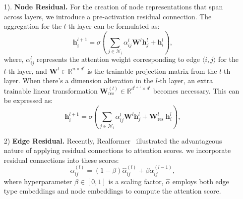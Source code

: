 \begin{itemize}
    \item[1).]{{\bf Node Residual.} For the creation of node representations that span across layers, we introduce a pre-activation residual connection. The aggregation for the $l$-th layer can be formulated as:
    \begin{equation}
        \mathbf{h}_i^{l+1}=\sigma\left(\sum_{j \in \mathcal{N}_i} \alpha_{ij}^{l} \mathbf{W}^{l} \mathbf{h}_j^{l}+\mathbf{h}_i^{l}\right),
       \label{eq:node1}
    \end{equation}
    where, $\alpha_{ij}^l$ represents the attention weight corresponding to edge $\langle i, j\rangle $ for the $l$-th layer, and $\mathbf{W}^l \in \mathbb{R}^{n \times {d^{l}}}$ is the trainable projection matrix from the $l$-th layer. When there's a dimension alteration in the $l$-th layer, an extra trainable linear transformation $\mathbf{W}_{\text{res}}^{(l)} \in \mathbb{R}^{d^{l+1} \times d^{l}}$ becomes necessary. This can be expressed as:
    \begin{equation}
        \mathbf{h}_i^{l+1}=\sigma(\sum_{j \in \mathcal{N}_i} \alpha_{i j}^{l} \mathbf{W}^{l} \mathbf{h}_j^{l}+\mathbf{W}_{\text {res }}^{l} \mathbf{h}_i^{l}),
        \label{eq:node2}
    \end{equation}
    }

    \item[2)]{{\bf Edge Residual.} Recently, Realformer~\cite{he2020realformer} illustrated the advantageous nature of applying residual connections to attention scores. we incorporate residual connections into these scores:
    \begin{equation}
        \alpha_{i j}^{(l)}=(1-\beta) \hat{\alpha}_{i j}^{(l)}+\beta \alpha_{i j}^{(l-1)},
        \label{eq:edge}
    \end{equation}
    where hyperparameter $\beta \in [0, 1]$ is a scaling factor, $\hat{\alpha}$ employs both edge type embeddings and node embeddings to compute the attention score.
    }
\end{itemize}

